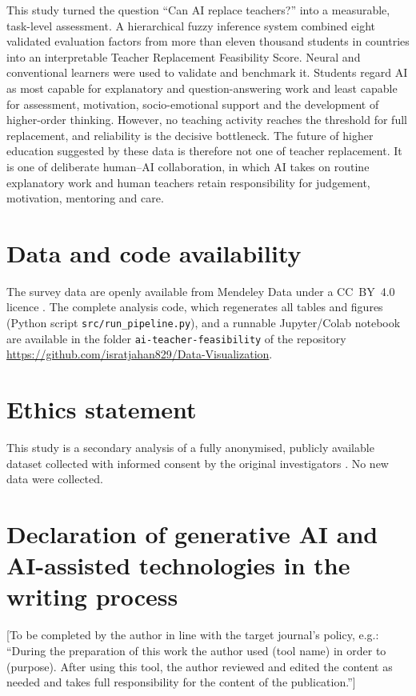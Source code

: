\documentclass[preprint,12pt,authoryear]{elsarticle}
\theoremstyle{remark}
\begin{document}
This study turned the question ``Can AI replace teachers?'' into a measurable, task-level assessment. A hierarchical fuzzy inference system combined eight validated evaluation factors from more than eleven thousand students in \Ncountries{} countries into an interpretable Teacher Replacement Feasibility Score. Neural and conventional learners were used to validate and benchmark it. Students regard AI as most capable for explanatory and question-answering work and least capable for assessment, motivation, socio-emotional support and the development of higher-order thinking. However, no teaching activity reaches the threshold for full replacement, and reliability is the decisive bottleneck. The future of higher education suggested by these data is therefore not one of teacher replacement. It is one of deliberate human--AI collaboration, in which AI takes on routine explanatory work and human teachers retain responsibility for judgement, motivation, mentoring and care.

\section*{Data and code availability}
The survey data are openly available from Mendeley Data under a CC~BY~4.0 licence \citep{ravselj2024data}. The complete analysis code, which regenerates all tables and figures (Python script \texttt{src/run\_pipeline.py}), and a runnable Jupyter/Colab notebook are available in the folder \texttt{ai-teacher-feasibility} of the repository\\ \url{https://github.com/isratjahan829/Data-Visualization}.

\section*{Ethics statement}
This study is a secondary analysis of a fully anonymised, publicly available dataset collected with informed consent by the original investigators \citep{ravselj2025}. No new data were collected.

\section*{Declaration of generative AI and AI-assisted technologies in the writing process}
[To be completed by the author in line with the target journal's policy, e.g.: ``During the preparation of this work the author used (tool name) in order to (purpose). After using this tool, the author reviewed and edited the content as needed and takes full responsibility for the content of the publication.'']
\end{document}
